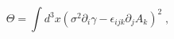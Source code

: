 \begin{equation}
\Theta =\int d^{3}x\left( \sigma ^{2}\partial _{i}\gamma -\epsilon
_{ijk}\partial _{j}A_{k}\right) ^{2}\;,  \label{th}
\end{equation}

